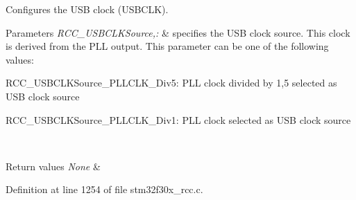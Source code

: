 Configures the U\-S\-B clock (U\-S\-B\-C\-L\-K). 


\begin{DoxyParams}{Parameters}
{\em R\-C\-C\-\_\-\-U\-S\-B\-C\-L\-K\-Source,\-:} & specifies the U\-S\-B clock source. This clock is derived from the P\-L\-L output. This parameter can be one of the following values\-: \begin{DoxyItemize}
\item R\-C\-C\-\_\-\-U\-S\-B\-C\-L\-K\-Source\-\_\-\-P\-L\-L\-C\-L\-K\-\_\-Div5\-: P\-L\-L clock divided by 1,5 selected as U\-S\-B clock source \item R\-C\-C\-\_\-\-U\-S\-B\-C\-L\-K\-Source\-\_\-\-P\-L\-L\-C\-L\-K\-\_\-\-Div1\-: P\-L\-L clock selected as U\-S\-B clock source \end{DoxyItemize}
\\
\hline
\end{DoxyParams}

\begin{DoxyRetVals}{Return values}
{\em None} & \\
\hline
\end{DoxyRetVals}


Definition at line 1254 of file stm32f30x\-\_\-rcc.\-c.

